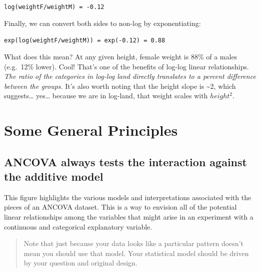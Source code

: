 \documentclass[
]{book}
\begin{document}
\texttt{log(weightF/weightM)\ =\ -0.12}

Finally, we can convert both sides to non-log by exponentiating:

\texttt{exp(log(weightF/weightM))\ =\ exp(-0.12)\ =\ 0.88}

What does this mean? At any given height, female weight is 88\% of a males (e.g.~12\% lower). Cool! That's one of the benefits of log-log linear relationships. \emph{The ratio of the categories in log-log land directly translates to a percent difference between the groups}. It's also worth noting that the height slope is \textasciitilde2, which suggests\ldots{} yes\ldots{} because we are in log-land, that weight scales with \(height^2\).

\hypertarget{some-general-principles}{%
\section{Some General Principles}\label{some-general-principles}}

\hypertarget{ancova-always-tests-the-interaction-against-the-additive-model}{%
\subsection{ANCOVA always tests the interaction against the additive model}\label{ancova-always-tests-the-interaction-against-the-additive-model}}

This figure highlights the various models and interpretations associated with the pieces of an ANCOVA dataset. This is a way to envision all of the potential linear relationships among the variables that might arise in an experiment with a continuous and categorical explanatory variable.

\begin{quote}
Note that just because your data looks like a particular pattern doesn't mean you should use that model. Your statistical model should be driven by your question and original design.
\end{quote}
\end{document}
